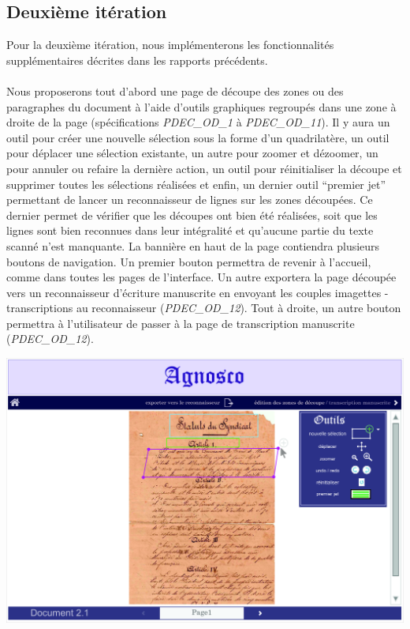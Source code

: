 \newpage{}

\subsection{Deuxième itération}

Pour la deuxième itération, nous implémenterons les fonctionnalités supplémentaires décrites dans les rapports précédents.

\paragraph{}
Nous proposerons tout d’abord une page de découpe des zones ou des paragraphes du document à l’aide d’outils graphiques regroupés dans une zone à droite de la page (spécifications \textit{PDEC\_OD\_1} à \textit{PDEC\_OD\_11}). Il y aura un outil pour créer une nouvelle sélection sous la forme d’un quadrilatère, un outil pour déplacer une sélection existante, un autre pour zoomer et dézoomer, un pour annuler ou refaire la dernière action, un outil pour réinitialiser la découpe et supprimer toutes les sélections réalisées et enfin, un dernier outil “premier jet” permettant de lancer un reconnaisseur de lignes sur les zones découpées. Ce dernier permet de vérifier que les découpes ont bien été réalisées, soit que les lignes sont bien reconnues dans leur intégralité et qu'aucune partie du texte scanné n’est manquante.
\newline{}
La bannière en haut de la page contiendra plusieurs boutons de navigation. Un premier bouton permettra de revenir à l’accueil, comme dans toutes les pages de l’interface. Un autre exportera la page découpée vers un reconnaisseur d’écriture manuscrite en envoyant les couples imagettes - transcriptions au reconnaisseur (\textit{PDEC\_OD\_12}). Tout à droite, un autre bouton permettra à l’utilisateur de passer à la page de transcription manuscrite (\textit{PDEC\_OD\_12}).

\begin{mdframed}[frametitle={Figure 3 : Maquette de la page de découpe des zones}, innerbottommargin=10]
\begin{center}
\includegraphics[scale=0.04]{assets/maquetteIHMdecoupes.jpg}
\end{center}
\end{mdframed}

